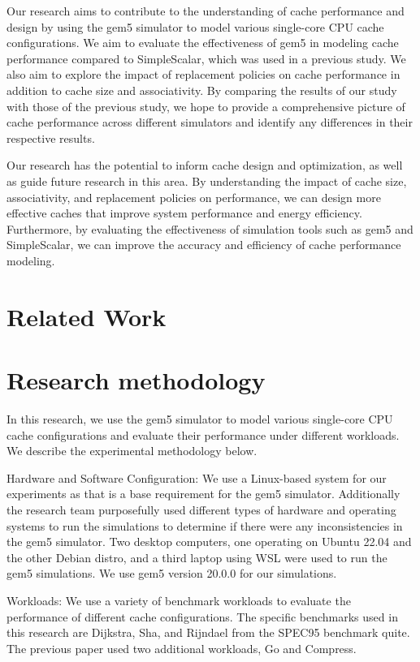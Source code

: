 \documentclass[conference]{IEEEtran}
\begin{document}
Our research aims to contribute to the understanding of cache performance and design by using the gem5 simulator to model various single-core CPU cache configurations. We aim to evaluate the effectiveness of gem5 in modeling cache performance compared to SimpleScalar, which was used in a previous study. We also aim to explore the impact of replacement policies on cache performance in addition to cache size and associativity. By comparing the results of our study with those of the previous study, we hope to provide a comprehensive picture of cache performance across different simulators and identify any differences in their respective results.

Our research has the potential to inform cache design and optimization, as well as guide future research in this area. By understanding the impact of cache size, associativity, and replacement policies on performance, we can design more effective caches that improve system performance and energy efficiency. Furthermore, by evaluating the effectiveness of simulation tools such as gem5 and SimpleScalar, we can improve the accuracy and efficiency of cache performance modeling.

\section{Related Work}

\section{Research methodology}
In this research, we use the gem5 simulator to model various single-core CPU cache configurations and evaluate their performance under different workloads. We describe the experimental methodology below.

Hardware and Software Configuration:
We use a Linux-based system for our experiments as that is a base requirement for the gem5 simulator. Additionally the research team purposefully used different types of hardware and operating systems to run the simulations to determine if there were any inconsistencies in the gem5 simulator. Two desktop computers, one operating on Ubuntu 22.04 and the other Debian distro, and a third laptop using WSL were used to run the gem5 simulations. We use gem5 version 20.0.0 for our simulations.

Workloads:
We use a variety of benchmark workloads to evaluate the performance of different cache configurations. The specific benchmarks used in this research are Dijkstra, Sha, and Rijndael from the SPEC95 benchmark quite. The previous paper used two additional workloads, Go and Compress.
\end{document}
